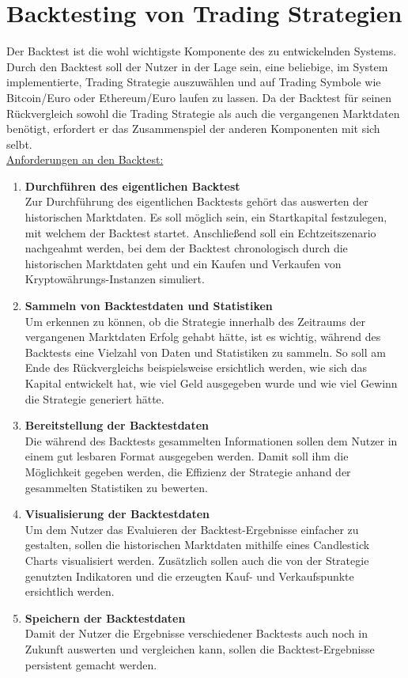 \documentclass[oneside]{ausarbeitung}
\begin{document}

\section{Backtesting von Trading Strategien}
\label{sec:backtesting}

Der Backtest ist die wohl wichtigste Komponente des zu entwickelnden
Systems. Durch den Backtest soll der Nutzer in der Lage sein, eine
beliebige, im System implementierte, Trading Strategie auszuwählen
und auf Trading Symbole wie Bitcoin/Euro oder Ethereum/Euro laufen zu
lassen. Da der Backtest für seinen Rückvergleich sowohl die Trading
Strategie als auch die vergangenen Marktdaten benötigt, erfordert er
das Zusammenspiel der anderen Komponenten mit sich selbt. \\

\underline{Anforderungen an den Backtest:}
\begin{enumerate}
	\item \textbf{Durchführen des eigentlichen Backtest} \\
		Zur Durchführung des eigentlichen Backtests gehört das auswerten der 
		historischen Marktdaten. Es soll möglich sein, ein Startkapital
		festzulegen, mit welchem der Backtest startet. Anschließend soll ein
		Echtzeitszenario nachgeahmt werden, bei dem der Backtest chronologisch
		durch die historischen Marktdaten geht und ein Kaufen und Verkaufen von
		Kryptowährungs-Instanzen simuliert.  
	\item \textbf{Sammeln von Backtestdaten und Statistiken} \\
		Um erkennen zu können, ob die Strategie innerhalb des Zeitraums der 
		vergangenen Marktdaten Erfolg gehabt hätte, ist es wichtig, während des 
		Backtests eine Vielzahl	von Daten und Statistiken zu sammeln. So soll am
		Ende des Rückvergleichs beispielsweise ersichtlich werden, wie sich das
		Kapital entwickelt hat, wie viel Geld ausgegeben wurde und wie viel
		Gewinn die Strategie generiert hätte.
	\item \textbf{Bereitstellung der Backtestdaten} \\
		Die während des Backtests gesammelten Informationen sollen dem Nutzer
		in einem gut lesbaren Format ausgegeben werden. Damit soll ihm
		die Möglichkeit gegeben werden, die Effizienz der Strategie anhand der
		gesammelten Statistiken zu bewerten.
	\item \textbf{Visualisierung der Backtestdaten} \\
		Um dem Nutzer das Evaluieren der Backtest-Ergebnisse einfacher zu
		gestalten, sollen die historischen Marktdaten mithilfe eines
		Candlestick Charts visualisiert werden. Zusätzlich sollen auch die
		von der Strategie genutzten Indikatoren und die erzeugten Kauf- und
		Verkaufspunkte ersichtlich werden.
	\item \textbf{Speichern der Backtestdaten} \\
		Damit der Nutzer die Ergebnisse verschiedener Backtests auch noch in
		Zukunft auswerten und vergleichen kann, sollen die Backtest-Ergebnisse
		persistent gemacht werden.
\end{enumerate}
\end{document}
